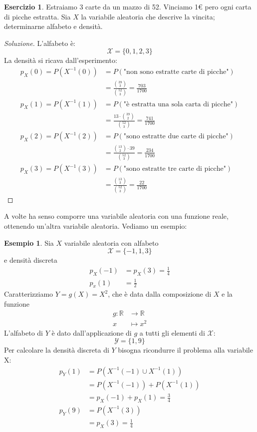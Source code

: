 \documentclass{article}
\theoremstyle{plain}
\theoremstyle{definition}
\newtheorem{esercizio}{Esercizio}[section]
\newtheorem{esempio}{Esempio}[section]
\theoremstyle{remark}
\newenvironment{soluzione}
	{\renewcommand\qedsymbol{$\mathwitch*$}\begin{proof}[Soluzione]}
	{\end{proof}}
\renewcommand{\qedsymbol}{$\mathrightghost$}
\begin{document}
\begin{esercizio}
	Estraiamo 3 carte da un mazzo di 52. Vinciamo 1€ pero ogni carta di picche estratta. Sia $X$ la variabile aleatoria che descrive la vincita; determinarne alfabeto e densità.
	\begin{soluzione}
		L'alfabeto è:
		\begin{equation*}
			\mathcal{X}=\{0,1,2,3\}
		\end{equation*}
		La densità si ricava dall'esperimento:
		\begin{align*}
			p_X(0)=P(X^{-1}(0))&=P(\text{"non sono estratte carte di picche"})\\
			&=\frac{\binom{39}{3}}{\binom{52}{3}}=\frac{703}{1700}\\
			p_X(1)=P(X^{-1}(1))&=P(\text{"è estratta una sola carta di picche"})\\
			&=\frac{13\cdot\binom{39}{2}}{\binom{52}{3}}=\frac{741}{1700}\\
			p_X(2)=P(X^{-1}(2))&=P(\text{"sono estratte due carte di picche"})\\
			&=\frac{\binom{13}{2}\cdot39}{\binom{52}{3}}=\frac{234}{1700}\\
			p_X(3)=P(X^{-1}(3))&=P(\text{"sono estratte tre carte di picche"})\\
			&=\frac{\binom{13}{3}}{\binom{52}{3}}=\frac{22}{1700}
		\end{align*}
	\end{soluzione}
\end{esercizio}
A volte ha senso comporre una variabile aleatoria con una funzione reale, ottenendo un'altra variabile aleatoria. Vediamo un esempio:
\begin{esempio}
	Sia $X$ variabile aleatoria con alfabeto
	\begin{equation*}
		\mathcal{X}=\{-1,1,3\}
	\end{equation*}
	e densità discreta
	\begin{align*}
		p_X(-1)&=p_X(3)=\frac{1}{4}\\
		p_x(1)&=\frac{1}{2}
	\end{align*}
	Caratterizziamo $Y=g(X)=X^2$, che è data dalla composizione di $X$ e la funzione
	\begin{align*}
		g:\mathds{R}&\to\mathds{R}\\
		x&\mapsto x^2
	\end{align*}
	L'alfabeto di $Y$ è dato dall'applicazione di $g$ a tutti gli elementi di $\mathcal{X}$:
	\begin{equation*}
		\mathcal{Y}=\{1,9\}
	\end{equation*}
	Per calcolare la densità discreta di $Y$ bisogna ricondurre il problema alla variabile X:
	\begin{align*}
		p_Y(1)&=P(X^{-1}(-1)\cup X^{-1}(1))\\
		&=P(X^{-1}(-1))+P(X^{-1}(1))\\
		&=p_X(-1)+p_X(1)=\frac{3}{4}\\
		p_Y(9)&=P(X^{-1}(3))\\
		&=p_X(3)=\frac{1}{4}
	\end{align*}
\end{esempio}
\end{document}
